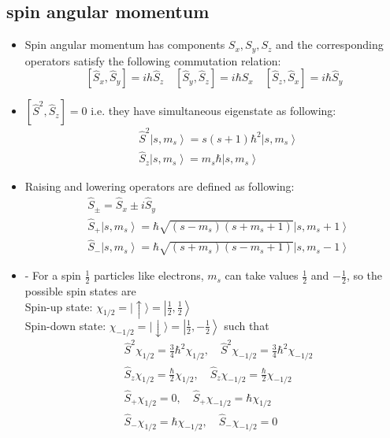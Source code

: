  \subsection{ spin angular momentum}
 \begin{itemize}
 	\item Spin angular momentum has components $S_x,S_y,S_z$ and the corresponding operators satisfy the following commutation relation:
 	$$
 	\left[\hat{S}_{x}, \hat{S}_{y}\right]=i h \hat{S}_{z} \quad\left[\hat{S}_{y}, \hat{S}_{z}\right]=i \hbar \hat{S}_{x} \quad\left[\hat{S}_{z}, \hat{S}_{x}\right]=i \hbar \hat{S}_{y}
 	$$
 	\item $\left[\hat{S}^{2}, \hat{S}_{z}\right]=0$ i.e. they have simultaneous eigenstate as following:
 	$$
 	\begin{aligned}
 	&\hat{S}^{2}\left|s, m_{s}\right\rangle=s(s+1) \hbar^{2}\left|s, m_{s}\right\rangle \\
 	&\hat{S}_{z}\left|s, m_{s}\right\rangle=m_{s} \hbar\left|s, m_{s}\right\rangle
 	\end{aligned}
 	$$
 	\item Raising and lowering operators are defined as following:
 	$$
 	\begin{aligned}
 	&\hat{S}_{\pm}=\hat{S}_{x} \pm i \hat{S}_{y} \\
 	&\hat{S}_{+}\left|s, m_{s}\right\rangle=\hbar \sqrt{\left(s-m_{s}\right)\left(s+m_{s}+1\right)}\left|s, m_{s}+1\right\rangle \\
 	&\hat{S}_{-}\left|s, m_{s}\right\rangle=\hbar \sqrt{\left(s+m_{s}\right)\left(s-m_{s}+1\right)}\left|s, m_{s}-1\right\rangle
 	\end{aligned}
 	$$
 	\item - For a spin $\frac{1}{2}$ particles like electrons, $m_{s}$ can take values $\frac{1}{2}$ and $-\frac{1}{2}$, so the possible spin states are\\
 	Spin-up state: $\chi_{1 / 2}=|\uparrow\rangle=\left|\frac{1}{2}, \frac{1}{2}\right\rangle$\\
 	Spin-down state: $\chi_{-1 / 2}=|\downarrow\rangle=\left|\frac{1}{2},-\frac{1}{2}\right\rangle$
 	such that
 	$$\begin{aligned}
 		&\hat{S}^{2} \chi_{1 / 2}=\frac{3}{4} \hbar^{2} \chi_{1 / 2}, \quad \hat{S}^{2} \chi_{-1 / 2}=\frac{3}{4} \hbar^{2} \chi_{-1 / 2} \\
 		&\hat{S}_{z} \chi_{1 / 2}=\frac{\hbar}{2} \chi_{1 / 2}, \quad \hat{S}_{z} \chi_{-1 / 2}=\frac{\hbar}{2} \chi_{-1 / 2} \\
 		&\hat{S}_{+} \chi_{1 / 2}=0, \quad \hat{S}_{+} \chi_{-1 / 2}=\hbar \chi_{1 / 2} \\
 		&\hat{S}_{-} \chi_{1 / 2}=\hbar \chi_{-1 / 2}, \quad \hat{S}_{-} \chi_{-1 / 2}=0
 	\end{aligned}$$
 \end{itemize}
